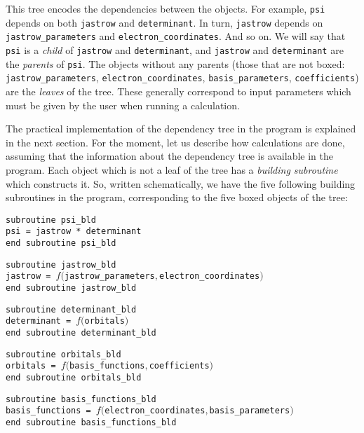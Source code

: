 \documentclass[a4paper,11pt]{article}
\begin{document}
This tree encodes the dependencies between the objects. For example, {\tt psi} depends on both {\tt jastrow} and {\tt determinant}. In turn, {\tt jastrow} depends on {\tt jastrow_parameters} and {\tt electron_coordinates}. And so on. We will say that {\tt psi} is a {\it child} of {\tt jastrow} and {\tt determinant}, and {\tt jastrow} and {\tt determinant} are the {\it parents} of  {\tt psi}. The objects without any parents (those that are not boxed: {\tt jastrow_parameters}, {\tt electron_coordinates}, {\tt basis_parameters}, {\tt coefficients}) are the {\it leaves} of the tree. These generally correspond to input parameters which must be given by the user when running a calculation.

\vspace{1em}
The practical implementation of the dependency tree in the program is explained in the next section. For the moment, let us describe how calculations are done, assuming that the information about the dependency tree is available in the program.
Each object which is not a leaf of the tree has a {\it building subroutine} which constructs it. So, written schematically, we have the five following building subroutines in the program, corresponding to the five boxed objects of the tree:

\vspace{0.5cm}
\noindent
{\tt subroutine psi_bld\\
psi = jastrow * determinant\\
end subroutine psi_bld}

\vspace{0.5cm}
\noindent
{\tt subroutine jastrow_bld\\
jastrow  = $f(${\tt jastrow_parameters}$,${\tt electron_coordinates}$)$\\
end subroutine jastrow_bld}

\vspace{0.5cm}
\noindent
{\tt subroutine determinant_bld\\
determinant  = $f(${\tt orbitals}$)$\\
end subroutine determinant_bld}

\vspace{0.5cm}
\noindent
{\tt subroutine orbitals_bld\\
orbitals  = $f(${\tt basis_functions}$,${\tt coefficients}$)$\\
end subroutine orbitals_bld}

\vspace{0.5cm}
\noindent
{\tt subroutine basis_functions_bld\\
basis_functions  = $f(${\tt electron_coordinates}$,${\tt basis_parameters}$)$\\
end subroutine basis_functions_bld}
\end{document}
